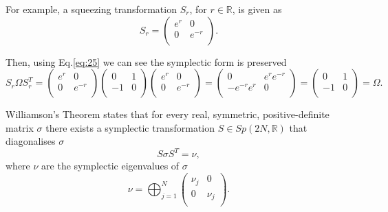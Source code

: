 \documentclass[11pt,a4paper,openbib]{article}
\numberwithin{equation}{section}
\begin{document}
For example, a squeezing transformation $S_r$, for $r \in \mathbb{R}$, is given as
\begin{equation*}
S_r = \begin{pmatrix}
e^r & 0  \\
0 & e^{-r} \\
\end{pmatrix}.
\end{equation*}

Then, using Eq.\ref{eq:25} we can see the symplectic form is preserved
\begin{equation*}
S_r\Omega S_r^{T} = \begin{pmatrix}
e^r & 0  \\
0 & e^{-r} \\
\end{pmatrix}
\begin{pmatrix}
0 & 1  \\
-1 & 0 \\
\end{pmatrix}
\begin{pmatrix}
e^r & 0  \\
0 & e^{-r} \\
\end{pmatrix}  = \begin{pmatrix}
0 & e^re^{-r}  \\
-e^{-r}e^r & 0 \\
\end{pmatrix} = \begin{pmatrix}
0 & 1 \\
-1 & 0 \\
\end{pmatrix} = \Omega .
\end{equation*}

Williamson's Theorem \cite{Williamson36} states that for every real, symmetric, positive-definite matrix  $\sigma$ there exists a symplectic transformation $S \in Sp(2N, \mathbb{R})$ that diagonalises $\sigma$
\begin{equation} \label{eq:27}
S\sigma S^T = \nu,
\end{equation}
where $\nu$ are the symplectic eigenvalues of $\sigma$ 
\begin{equation} \label{eq:28}
\nu = \bigoplus_{j=1}^{N} 
\begin{pmatrix}
\nu_j & 0  \\
0 & \nu_j \\
\end{pmatrix}.
\end{equation}
\end{document}
